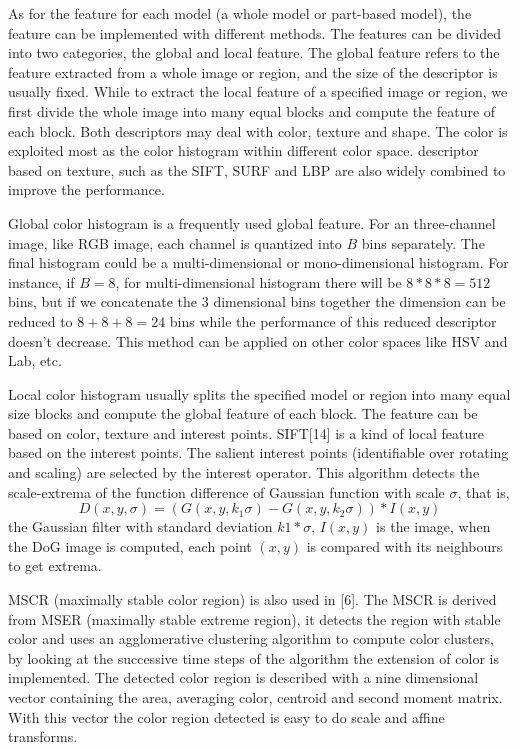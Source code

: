 As for the feature for each model (a whole model or part-based model), the feature can be implemented with different methods. The features can be divided into two categories, the global and local feature. The global feature refers to the feature extracted from a whole image or region, and the size of the descriptor is usually fixed. While to extract the local feature of a specified image or region, we first divide the whole image into many equal blocks and compute the feature of each block.  Both descriptors may deal with color, texture and shape. The color is exploited most as the color histogram within different color space. descriptor based on texture, such as the SIFT, SURF and LBP are also widely combined to improve the performance.

Global color histogram is a frequently used global feature. For an three-channel image, like RGB image, each channel is quantized into $B$ bins separately. The final histogram could be a multi-dimensional or mono-dimensional histogram. For instance, if $B=8$, for multi-dimensional histogram there will be $8*8*8=512$ bins, but if we concatenate the 3 dimensional bins together the dimension can be reduced to $8+8+8=24$ bins while the performance of this reduced descriptor doesn't decrease. This method can be applied on other color spaces like HSV and Lab, etc.

Local color histogram usually splits the specified model or region into many equal size blocks and compute the global feature of each block. The feature can be based on color, texture and interest points. SIFT[14] is a kind of local feature based on the interest points. The salient interest points (identifiable over rotating and scaling) are selected by the interest operator. This algorithm detects the scale-extrema of the function difference of Gaussian function with scale $\sigma$, that is, 
$$D(x,y,\sigma) = (G(x,y,k_1\sigma)-G(x,y,k_2\sigma))*I(x,y)$$
the Gaussian filter with standard deviation $k1*\sigma$, $I(x, y)$ is the image, when the DoG image is computed, each point $(x, y)$ is compared with its neighbours to get  extrema.

MSCR (maximally stable color region) is also used in [6]. The MSCR is derived from MSER (maximally stable extreme region), it detects the region with stable color and uses an agglomerative clustering algorithm to compute color clusters, by looking at the successive time steps of the algorithm the extension of color is implemented. The detected color region is described with a nine dimensional vector containing the area, averaging color, centroid and second moment matrix. With this vector the color region detected is easy to do scale and affine transforms.

